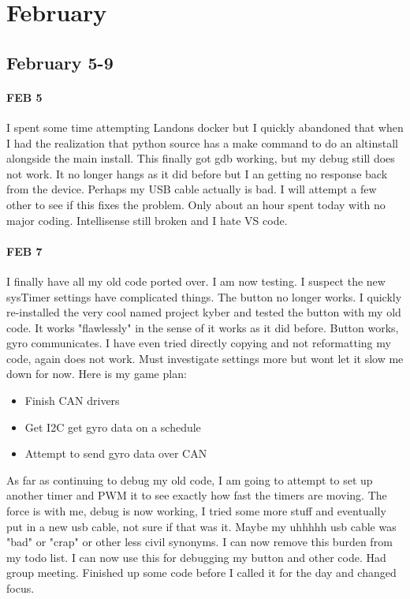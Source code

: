 \documentclass{article}
\begin{document}
\section{February}
\subsection{February 5-9}
\paragraph{FEB 5} I spent some time attempting Landons docker but I quickly abandoned that when I had the realization that python source has a make command to do an altinstall alongside the main install. This finally got gdb working, but my debug still does not work. It no longer hangs as it did before but I an getting no response back from the device. Perhaps my USB cable actually is bad. I will attempt a few other to see if this fixes the problem. Only about an hour spent today with no major coding. Intellisense still broken and I hate VS code. 
\paragraph{FEB 7} I finally have all my old code ported over. I am now testing. I suspect the new sysTimer settings have complicated things. The button no longer works. I quickly re-installed the very cool named project kyber and tested the button with my old code. It works "flawlessly" in the sense of it works as it did before. Button works, gyro communicates. I have even tried directly copying and not reformatting my code, again does not work. Must investigate settings more but wont let it slow me down for now. Here is my game plan:
\begin{itemize}
    \item Finish CAN drivers
    \item Get I2C get gyro data on a schedule
    \item Attempt to send gyro data over CAN
\end{itemize}
As far as continuing to debug my old code, I am going to attempt to set up another timer and PWM it to see exactly how fast the timers are moving. The force is with me, debug is now working, I tried some more stuff and eventually put in a new usb cable, not sure if that was it. Maybe my uhhhhh usb cable was "bad" or "crap" or other less civil synonyms. I can now remove this burden from my todo list. I can now use this for debugging my button and other code. Had group meeting. Finished up some code before I called it for the day and changed focus. 
\end{document}
